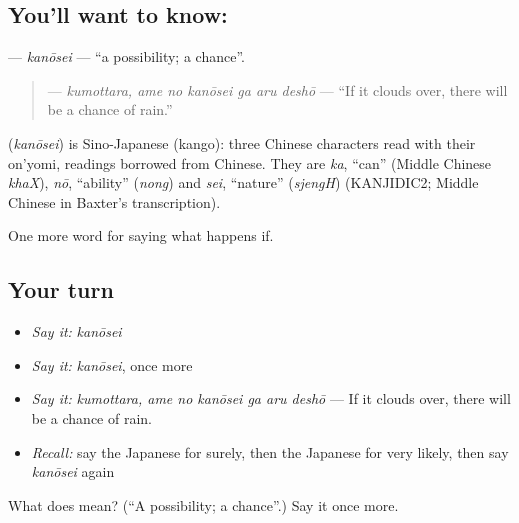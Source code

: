 \subsection*{You'll want to know: }
\textbf{} — \emph{kanōsei} — \textquotedblleft{}a possibility; a chance\textquotedblright{}.

\begin{quote}
\textbf{  } — \emph{kumottara, ame no kanōsei ga aru deshō} — \textquotedblleft{}If it clouds over, there will be a chance of rain.\textquotedblright{}
\end{quote}

\begin{cousinweb}
\textbf{} (\emph{kanōsei}) is Sino-Japanese (kango): three Chinese characters read with their on'yomi, readings borrowed from Chinese. They are \emph{ka}, \textquotedblleft{}can\textquotedblright{} (Middle Chinese \emph{khaX}), \emph{nō}, \textquotedblleft{}ability\textquotedblright{} (\emph{nong}) and \emph{sei}, \textquotedblleft{}nature\textquotedblright{} (\emph{sjengH}) (KANJIDIC2; Middle Chinese in Baxter's transcription).
\end{cousinweb}

\begin{grammarlens}[title={What you've built}]
One more word for saying what happens if.
\end{grammarlens}

\subsection*{Your turn}
\begin{itemize}
\raggedright
  \item \emph{Say it:} \emph{kanōsei}
  \item \emph{Say it:} \emph{kanōsei}, once more
  \item \emph{Say it:} \emph{kumottara, ame no kanōsei ga aru deshō} — If it clouds over, there will be a chance of rain.
  \item \emph{Recall:} say the Japanese for surely, then the Japanese for very likely, then say \emph{kanōsei} again
\end{itemize}

\begin{tcolorbox}[breakable,colback=teal!4,colframe=teal!35!black,title={Before you move on}]
What does  mean? (\textquotedblleft{}A possibility; a chance\textquotedblright{}.) Say it once more.
\end{tcolorbox}
